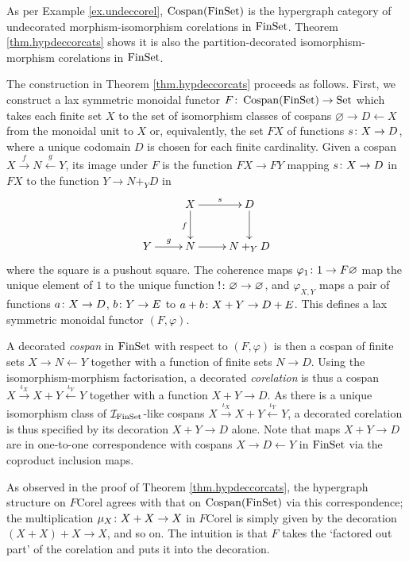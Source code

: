 \begin{example}
  As per Example \ref{ex.undeccorel}, $\operatorname{{Cospan}}(\mathrm{FinSet})$ is the hypergraph
  category of undecorated morphism-isomorphism corelations in $\mathrm{FinSet}$.
  Theorem \ref{thm.hypdeccorcats} shows it is also the partition-decorated
  isomorphism-morphism corelations in $\mathrm{FinSet}$.   
  
  The construction in Theorem \ref{thm.hypdeccorcats} proceeds as follows.
  First, we construct a lax symmetric monoidal functor $F{\colon} \operatorname{{Cospan}}(\mathrm{FinSet})
  \to \mathrm{Set}$ which takes each finite set $X$ to the set of isomorphism
  classes of cospans $\varnothing \to D \leftarrow X$ from the monoidal unit to
  $X$ or, equivalently, the set $FX$ of functions $s{\colon} X \to D$, where a
  unique codomain $D$ is chosen for each finite cardinality. Given a cospan $X
  \stackrel{f}\to N \stackrel{g}\leftarrow Y$, its image under $F$ is the
  function $FX \to FY$ mapping $s{\colon} X \to D$ in $FX$ to the function $Y \to
  N+_YD$ in
  \[
    \xymatrix{
      & X \ar[r]^s \ar[d]_f & D \ar[d] \\
      Y \ar[r]^g  & N \ar[r] & N+_YD
    }
  \]
  where the square is a pushout square. The coherence maps $\varphi_1{\colon} 1 \to
  F\varnothing$ map the unique element of $1$ to the unique function $!{\colon}
  \varnothing \to \varnothing$, and $\varphi_{X,Y}$ maps a pair of functions
  $a{\colon} X \to D$, $b{\colon} Y \to E$ to $a+b{\colon} X+Y \to D+E$. This defines a
  lax symmetric monoidal functor $(F,\varphi)$.

  A decorated \emph{cospan} in $\mathrm{FinSet}$ with respect to $(F,\varphi)$ is then a
  cospan of finite sets $X \to N \leftarrow Y$ together with a function of
  finite sets $N \to D$. Using the isomorphism-morphism factorisation, a
  decorated \emph{corelation} is thus a cospan $X \xrightarrow{\iota_X} X+Y
  \xleftarrow{\iota_Y} Y$ together with a function $X+Y \to D$. As there is a
  unique isomorphism class of $\mathcal I_{\mathrm{FinSet}}$-like cospans $X
  \xrightarrow{\iota_X} X+Y \xleftarrow{\iota_Y} Y$, a decorated corelation is
  thus specified by its decoration $X+Y \to D$ alone. Note that
  maps $X+Y \to D$ are in one-to-one correspondence with cospans $X \to D
  \leftarrow Y$ in $\mathrm{FinSet}$ via the coproduct inclusion maps.

  As observed in the proof of Theorem \ref{thm.hypdeccorcats}, the hypergraph
  structure on $F\mathrm{Corel}$ agrees with that on $\operatorname{{Cospan}}(\mathrm{FinSet})$ via
  this correspondence; the multiplication \linebreak $\mu_X{\colon} X+X \to X$ in
  $F\mathrm{Corel}$ is simply given by the decoration $(X+X)+X \to X$, and so
  on. The intuition is that $F$ takes the `factored out part' of the corelation
  and puts it into the decoration. 


\end{example}
